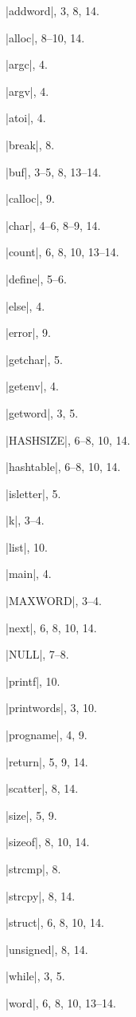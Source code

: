 \beginindex
\newletter
|addword|, 3, 8, 14.\par
|alloc|, 8--10, 14.\par
|argc|, 4.\par
|argv|, 4.\par
|atoi|, 4.\par
\newletter
|break|, 8.\par
|buf|, 3--5, 8, 13--14.\par
\newletter
|calloc|, 9.\par
|char|, 4--6, 8--9, 14.\par
|count|, 6, 8, 10, 13--14.\par
\newletter
|define|, 5--6.\par
\newletter
|else|, 4.\par
|error|, 9.\par
\newletter
|getchar|, 5.\par
|getenv|, 4.\par
|getword|, 3, 5.\par
\newletter
|HASHSIZE|, 6--8, 10, 14.\par
|hashtable|, 6--8, 10, 14.\par
\newletter
|isletter|, 5.\par
\newletter
|k|, 3--4.\par
\newletter
|list|, 10.\par
\newletter
|main|, 4.\par
|MAXWORD|, 3--4.\par
\newletter
|next|, 6, 8, 10, 14.\par
|NULL|, 7--8.\par
\newletter
|printf|, 10.\par
|printwords|, 3, 10.\par
|progname|, 4, 9.\par
\newletter
|return|, 5, 9, 14.\par
\newletter
|scatter|, 8, 14.\par
|size|, 5, 9.\par
|sizeof|, 8, 10, 14.\par
|strcmp|, 8.\par
|strcpy|, 8, 14.\par
|struct|, 6, 8, 10, 14.\par
\newletter
|unsigned|, 8, 14.\par
\newletter
|while|, 3, 5.\par
|word|, 6, 8, 10, 13--14.\par
\endindex
